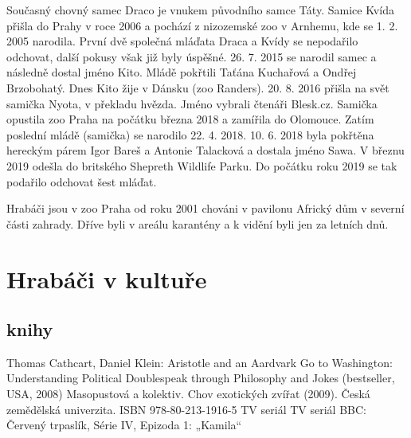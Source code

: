 \documentclass[a4paper, 12pt]{article}
\begin{document}
Současný chovný samec Draco je vnukem původního samce Táty. 
Samice Kvída přišla do Prahy v roce 2006 a pochází z nizozemské zoo v Arnhemu, kde se 1. 2. 2005 narodila. 
První dvě společná mláďata Draca a Kvídy se nepodařilo odchovat, další pokusy však již byly úspěšné. 26. 7. 2015 se narodil samec a následně dostal jméno Kito. 
Mládě pokřtili Taťána Kuchařová a Ondřej Brzobohatý. Dnes Kito žije v Dánsku (zoo Randers). 20. 8. 2016 přišla na svět samička Nyota, v překladu hvězda. 
Jméno vybrali čtenáři Blesk.cz. Samička opustila zoo Praha na počátku března 2018 a zamířila do Olomouce. Zatím poslední mládě (samička) se narodilo 22. 4. 2018. 
10. 6. 2018 byla pokřtěna hereckým párem Igor Bareš a Antonie Talacková a dostala jméno Sawa. V březnu 2019 odešla do britského Shepreth Wildlife Parku. Do počátku roku 2019 se tak podařilo odchovat šest mláďat.

Hrabáči jsou v zoo Praha od roku 2001 chováni v pavilonu Africký dům v severní části zahrady. Dříve byli v areálu karantény a k vidění byli jen za letních dnů.

\section{Hrabáči v kultuře}

\subsection{knihy}

Thomas Cathcart, Daniel Klein: Aristotle and an Aardvark Go to Washington: Understanding Political Doublespeak through Philosophy and Jokes (bestseller, USA, 2008)
Masopustová a kolektiv. Chov exotických zvířat (2009). Česká zemědělská univerzita. ISBN 978-80-213-1916-5
TV seriál
TV seriál BBC: Červený trpaslík, Série IV, Epizoda 1: „Kamila“
\end{document}
